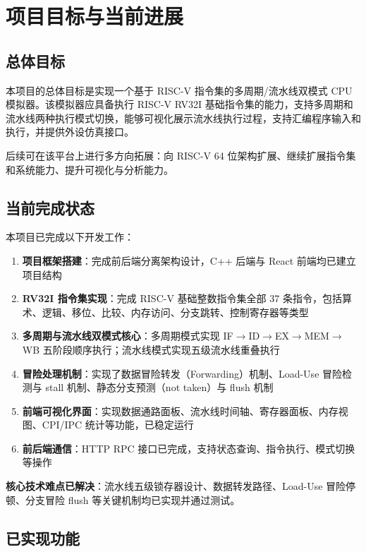 \documentclass[12pt, a4paper]{article}
\begin{document}
\section{项目目标与当前进展}\label{sec:goals}

\subsection{总体目标}

本项目的总体目标是实现一个基于 RISC-V 指令集的多周期/流水线双模式 CPU 模拟器。该模拟器应具备执行 RISC-V RV32I 基础指令集的能力，支持多周期和流水线两种执行模式切换，能够可视化展示流水线执行过程，支持汇编程序输入和执行，并提供外设仿真接口。

后续可在该平台上进行多方向拓展：向 RISC-V 64 位架构扩展、继续扩展指令集和系统能力、提升可视化与分析能力。

\subsection{当前完成状态}

本项目已完成以下开发工作：

\begin{enumerate}
\item \textbf{项目框架搭建}：完成前后端分离架构设计，C++ 后端与 React 前端均已建立项目结构
\item \textbf{RV32I 指令集实现}：完成 RISC-V 基础整数指令集全部 37 条指令，包括算术、逻辑、移位、比较、内存访问、分支跳转、控制寄存器等类型
\item \textbf{多周期与流水线双模式核心}：多周期模式实现 IF$\rightarrow$ID$\rightarrow$EX$\rightarrow$MEM$\rightarrow$WB 五阶段顺序执行；流水线模式实现五级流水线重叠执行
\item \textbf{冒险处理机制}：实现了数据冒险转发（Forwarding）机制、Load-Use 冒险检测与 stall 机制、静态分支预测（not taken）与 flush 机制
\item \textbf{前端可视化界面}：实现数据通路面板、流水线时间轴、寄存器面板、内存视图、CPI/IPC 统计等功能，已稳定运行
\item \textbf{前后端通信}：HTTP RPC 接口已完成，支持状态查询、指令执行、模式切换等操作
\end{enumerate}

\textbf{核心技术难点已解决}：流水线五级锁存器设计、数据转发路径、Load-Use 冒险停顿、分支冒险 flush 等关键机制均已实现并通过测试。

\subsection{已实现功能}
\end{document}
